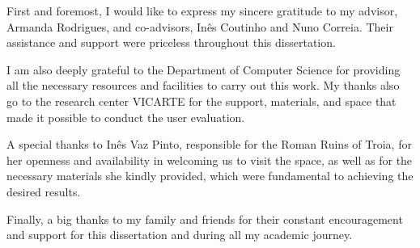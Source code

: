
%

\begin{ntacknowledgements}

First and foremost, I would like to express my sincere gratitude to my advisor, Armanda Rodrigues, and co-advisors, Inês Coutinho and Nuno Correia. Their assistance and support were priceless throughout this dissertation.

I am also deeply grateful to the Department of Computer Science for providing all the necessary resources and facilities to carry out this work. My thanks also go to the research center VICARTE for the support, materials, and space that made it possible to conduct the user evaluation.

A special thanks to Inês Vaz Pinto, responsible for the Roman Ruins of Troia, for her openness and availability in welcoming us to visit the space, as well as for the necessary materials she kindly provided, which were fundamental to achieving the desired results.

Finally, a big thanks to my family and friends for their constant encouragement and support for this dissertation and during all my academic journey.

\end{ntacknowledgements}
